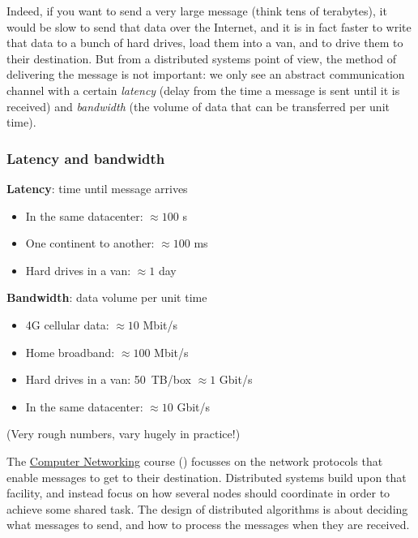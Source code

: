 
Indeed, if you want to send a very large message (think tens of terabytes), it would be slow to send that data over the Internet, and it is in fact faster to write that data to a bunch of hard drives, load them into a van, and to drive them to their destination.
But from a distributed systems point of view, the method of delivering the message is not important: we only see an abstract communication channel with a certain \emph{latency} (delay from the time a message is sent until it is received) and \emph{bandwidth} (the volume of data that can be transferred per unit time).

\begin{frame}
    \label{s:latency-bandwidth}
    \frametitle{Latency and bandwidth}
    \textbf{Latency}: time until message arrives
    \begin{itemize}
        \item In the same datacenter: $\approx 100$ {\textmu}s
        \item One continent to another: $\approx 100$ ms
        \item Hard drives in a van: $\approx 1$ day\\[2em]
    \end{itemize}\pause
    \textbf{Bandwidth}: data volume per unit time
    \begin{itemize}
        \item 4G cellular data: $\approx 10$ Mbit/s
        \item Home broadband: $\approx 100$ Mbit/s
        \item Hard drives in a van: 50~TB/box $\approx 1$ Gbit/s
        \item In the same datacenter: $\approx 10$ Gbit/s\\[1em]
    \end{itemize}
    (Very rough numbers, vary hugely in practice!)
\end{frame}

The \href{\networking}{Computer Networking} course (\whenisnetworking) focusses on the network protocols that enable messages to get to their destination.
Distributed systems build upon that facility, and instead focus on how several nodes should coordinate in order to achieve some shared task.
The design of distributed algorithms is about deciding what messages to send, and how to process the messages when they are received.

